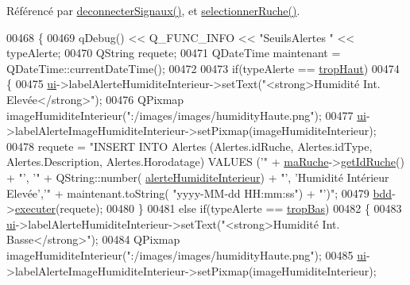 Référencé par \hyperlink{class_ruche_ihm_a348a76106f3072dd31a382c6025b8113}{deconnecter\+Signaux()}, et \hyperlink{class_ruche_ihm_a7324ae6ea574ccdad47783f466933157}{selectionner\+Ruche()}.


\begin{DoxyCode}
00468 \{
00469     qDebug() << Q\_FUNC\_INFO << \textcolor{stringliteral}{"SeuilsAlertes "} << typeAlerte;
00470     QString requete;
00471     QDateTime maintenant = QDateTime::currentDateTime();
00472 
00473     \textcolor{keywordflow}{if}(typeAlerte == \hyperlink{parametres_8h_aaa6de8207c94675264c90b10b613368dabc650d9700ae19f2696e6a6e3f9ab067}{tropHaut})
00474      \{
00475         \hyperlink{class_ruche_ihm_a64786058bd7f88ca2f1e9743bb27c25b}{ui}->labelAlerteHumiditeInterieur->setText(\textcolor{stringliteral}{"<strong>Humidité Int. Elevée</strong>"});
00476         QPixmap imageHumiditeInterieur(\textcolor{stringliteral}{":/images/images/humidityHaute.png"});
00477         \hyperlink{class_ruche_ihm_a64786058bd7f88ca2f1e9743bb27c25b}{ui}->labelAlerteImageHumiditeInterieur->setPixmap(imageHumiditeInterieur);
00478         requete = \textcolor{stringliteral}{"INSERT INTO Alertes (Alertes.idRuche, Alertes.idType, Alertes.Description,
       Alertes.Horodatage) VALUES ('"} + \hyperlink{class_ruche_ihm_a43a6b1fa31f4fba58d919daae3707b38}{maRuche}->\hyperlink{class_ruche_a9f2de5ef29557ec7a53d5e22df34d164}{getIdRuche}() + \textcolor{stringliteral}{"', '"} + QString::number(
      \hyperlink{parametres_8h_a83a725fd153179a2bd97afcc8307737bac0e80b2d9b7f04033abc44ebcf61883a}{alerteHumiditeInterieur}) + \textcolor{stringliteral}{"', 'Humidité Intérieur Elevée','"} + maintenant.toString(\textcolor{stringliteral}{
      "yyyy-MM-dd  HH:mm:ss"}) + \textcolor{stringliteral}{"')"};
00479         \hyperlink{class_ruche_ihm_a0851936fe212e8d40538264f09749153}{bdd}->\hyperlink{class_base_de_donnees_aa8de5f8f8bb17edc43f5c0ee33712081}{executer}(requete);
00480      \}
00481      \textcolor{keywordflow}{else} \textcolor{keywordflow}{if}(typeAlerte == \hyperlink{parametres_8h_aaa6de8207c94675264c90b10b613368da4257e2f8921856770c8266f55c937295}{tropBas})
00482      \{
00483         \hyperlink{class_ruche_ihm_a64786058bd7f88ca2f1e9743bb27c25b}{ui}->labelAlerteHumiditeInterieur->setText(\textcolor{stringliteral}{"<strong>Humidité Int. Basse</strong>"});
00484         QPixmap imageHumiditeInterieur(\textcolor{stringliteral}{":/images/images/humidityHaute.png"});
00485         \hyperlink{class_ruche_ihm_a64786058bd7f88ca2f1e9743bb27c25b}{ui}->labelAlerteImageHumiditeInterieur->setPixmap(imageHumiditeInterieur);

\end{DoxyCode}
